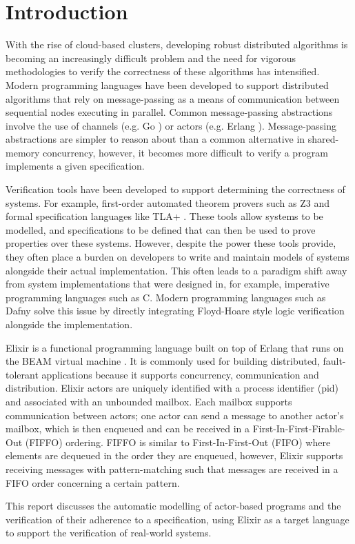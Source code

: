 \chapter{Introduction}
With the rise of cloud-based clusters, developing robust distributed algorithms is becoming an increasingly difficult problem and the need for vigorous methodologies to verify the correctness of these algorithms has intensified. Modern programming languages have been developed to support distributed algorithms that rely on message-passing as a means of communication between sequential nodes executing in parallel. Common message-passing abstractions involve the use of channels (e.g. Go \cite{go}) or actors \cite{actor} (e.g. Erlang \cite{erlang}). Message-passing abstractions are simpler to reason about than a common alternative in shared-memory concurrency, however, it becomes more difficult to verify a program implements a given specification.
\par
Verification tools have been developed to support determining the correctness of systems. For example, first-order automated theorem provers such as Z3 \cite{z3} and formal specification languages like TLA+ \cite{tlaplus}. These tools allow systems to be modelled, and specifications to be defined that can then be used to prove properties over these systems. However, despite the power these tools provide, they often place a burden on developers to write and maintain models of systems alongside their actual implementation. This often leads to a paradigm shift away from system implementations that were designed in, for example, imperative programming languages such as C. Modern programming languages such as Dafny \cite{dafny} solve this issue by directly integrating Floyd-Hoare style logic verification alongside the implementation.
\par
Elixir \cite{elixir} is a functional programming language built on top of Erlang that runs on the BEAM virtual machine \cite{beam}. It is commonly used for building distributed, fault-tolerant applications because it supports concurrency, communication and distribution. Elixir actors are uniquely identified with a process identifier (pid) and associated with an unbounded mailbox. Each mailbox supports communication between actors; one actor can send a message to another actor's mailbox, which is then enqueued and can be received in a First-In-First-Firable-Out (FIFFO) ordering. FIFFO is similar to First-In-First-Out (FIFO) where elements are dequeued in the order they are enqueued, however, Elixir supports receiving messages with pattern-matching such that messages are received in a FIFO order concerning a certain pattern.
\par
This report discusses the automatic modelling of actor-based programs and the verification of their adherence to a specification, using Elixir as a target language to support the verification of real-world systems.
